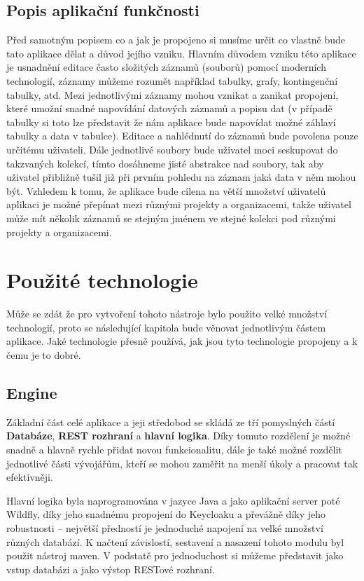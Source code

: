 \subsection{Popis aplikační funkčnosti}
\par Před samotným popisem co a jak je propojeno si musíme určit co vlastně bude tato aplikace dělat a důvod jejího vzniku. Hlavním důvodem vzniku této aplikace je usnadnění editace často složitých záznamů (souborů) pomocí moderních technologií, záznamy můžeme rozumět například tabulky, grafy, kontingenční tabulky, atd. Mezi jednotlivými záznamy mohou vznikat a zanikat propojení, které umožní snadné napovídání datových záznamů a popisu dat (v případě tabulky si toto lze představit že nám aplikace bude napovídat možné záhlaví tabulky a data v tabulce). Editace a nahlédnutí do záznamů bude povolena pouze určitému uživateli. Dále jednotlivé soubory bude uživatel moci seskupovat do takzvaných kolekcí, tímto dosáhneme jisté abstrakce nad soubory, tak aby uživatel přibližně tušil již při prvním pohledu na záznam jaká data v něm mohou být. Vzhledem k tomu, že aplikace bude cílena na větší množství uživatelů aplikaci je možné přepínat mezi různými projekty a organizacemi, takže uživatel může mít několik záznamů se stejným jménem ve stejné kolekci pod různými projekty a organizacemi.

\section{Použité technologie}
\par Může se zdát že pro vytvoření tohoto nástroje bylo použito velké množství technologií, proto se následující kapitola bude věnovat jednotlivým částem aplikace. Jaké technologie přesně používá, jak jsou tyto technologie propojeny a k čemu je to dobré.

\subsection{Engine}
\par Základní část celé aplikace a jeji středobod se skládá ze tří pomyslných částí \textbf{Databáze}, \textbf{REST rozhraní} a \textbf{hlavní logika}. Díky tomuto rozdělení je možné snadně a hlavně rychle přidat novou funkcionalitu, dále je také možné rozdělit jednotlivé části vývojářům, kteří se mohou zaměřit na menší úkoly a pracovat tak efektivněji.

\par Hlavní logika byla naprogramována v jazyce Java a jako aplikační server poté Wildfly, díky jeho snadnému propojení do Keycloaku a převážně díky jeho robustnosti -- největší předností je jednoduché napojení na velké množství různých databází. K načtení závislostí, sestavení a nasazení tohoto modulu byl použit nástroj maven. V podstatě pro jednoduchost si můžeme představit jako vstup databázi a jako výstop RESTové rozhraní.

